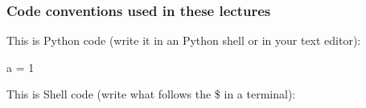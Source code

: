 \begin{frame}[fragile]
\frametitle{Code conventions used in these lectures}

This is Python code (write it in an Python shell or in your text editor):
\vspace{-1em}
\begin{python}
a = 1
\end{python}

This is Shell code (write what follows the \$ in a terminal):
\vspace{-1em}

\end{frame}
